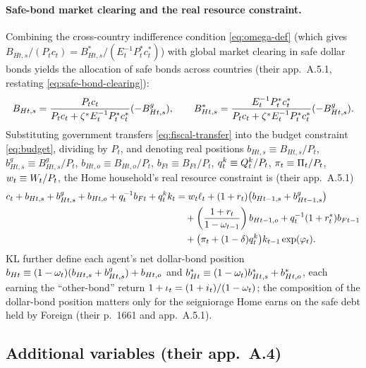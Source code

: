 \paragraph{Safe-bond market clearing and the real resource constraint.} Combining
the cross-country indifference condition \eqref{eq:omega-def} (which gives
$B_{Ht,s}/(P_t c_t)=B^{*}_{Ht,s}/(E_t^{-1}P^{*}_t c^{*}_t)$) with global market
clearing in safe dollar bonds yields the allocation of safe bonds across
countries (their app.\ A.5.1, restating \eqref{eq:safe-bond-clearing}):
\begin{equation}
\label{eq:safe-bond-split}
B_{Ht,s}=\frac{P_t c_t}{P_t c_t+\zeta^{*} E_t^{-1}P^{*}_t c^{*}_t}(-B^g_{Ht,s}),
\qquad
B^{*}_{Ht,s}=\frac{E_t^{-1}P^{*}_t c^{*}_t}{P_t c_t+\zeta^{*} E_t^{-1}P^{*}_t c^{*}_t}(-B^g_{Ht,s}).
\end{equation}
Substituting government transfers \eqref{eq:fiscal-transfer} into the budget
constraint \eqref{eq:budget}, dividing by $P_t$, and denoting real positions
$b_{Ht,s}\equiv B_{Ht,s}/P_t$, $b^g_{Ht,s}\equiv B^g_{Ht,s}/P_t$,
$b_{Ht,o}\equiv B_{Ht,o}/P_t$, $b_{Ft}\equiv B_{Ft}/P_t$, $q^{k}_t\equiv Q^k_t/P_t$,
$\pi_t\equiv\Pi_t/P_t$, $w_t\equiv W_t/P_t$, the Home household's real
resource constraint is (their app.\ A.5.1)
\begin{equation}
\label{eq:real-budget-home}
\begin{aligned}
c_t+b_{Ht,s}+b^g_{Ht,s}+b_{Ht,o}+q_t^{-1}b_{Ft}+q^{k}_t k_t
&=w_t\ell_t
+(1+r_t)\bigl(b_{Ht-1,s}+b^g_{Ht-1,s}\bigr)\\
&\quad+\left(\frac{1+r_t}{1-\omega_{t-1}}\right)b_{Ht-1,o}
+q_t^{-1}(1+r^{*}_t)b_{Ft-1}\\
&\quad+\bigl(\pi_t+(1-\delta)q^{k}_t\bigr)k_{t-1}\exp(\varphi_t).
\end{aligned}
\end{equation}
KL further define each agent's net dollar-bond position
$b_{Ht}\equiv(1-\omega_t)(b_{Ht,s}+b^g_{Ht,s})+b_{Ht,o}$ and
$b^{*}_{Ht}\equiv(1-\omega_t)b^{*}_{Ht,s}+b^{*}_{Ht,o}$, each earning the
``other-bond'' return $1+\iota_t=(1+i_t)/(1-\omega_t)$; the composition of the
dollar-bond position matters only for the seigniorage Home earns on the safe debt
held by Foreign (their p.~1661 and app.\ A.5.1).

\subsection{Additional variables (their app.\ A.4)}
\label{sec:aux-vars}

